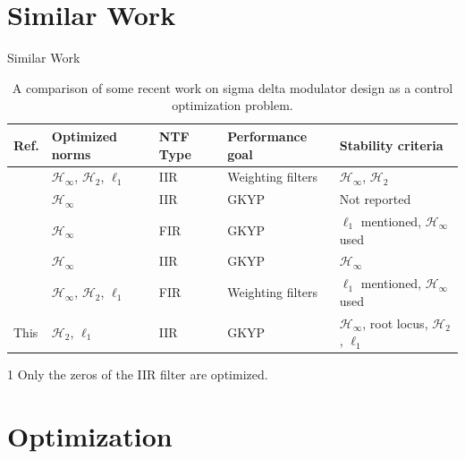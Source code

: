\documentclass[10pt,usenames,dvipsnames]{beamer}
\begin{document}
\section{Similar Work}

\begin{frame}{Similar Work}

\vspace{-0.8cm}
\begin{table}
\begin{threeparttable}
	\caption{A comparison of some recent work on sigma delta modulator design as a control optimization problem.}
	\begin{tabular}{p{0.5cm} p{1.8cm} p{0.6cm} p{1.9cm} p{3.3cm}}
		\toprule
		\textbf{Ref.} & \textbf{Optimized norms} & \textbf{NTF Type} & \textbf{Performance goal} & \textbf{Stability criteria} \\
		\midrule
		\cite{Oberoi2004} & $\mathcal{H}_\infty$, $\mathcal{H}_2$, $\ell_1$ & IIR &  Weighting filters & $\mathcal{H}_\infty$, $\mathcal{H}_2$ \\ 
		\cite{Osqui2007} & $\mathcal{H}_\infty$ & IIR\tnote{1} & GKYP & Not reported \\
		\cite{Nagahara2012} & $\mathcal{H}_\infty$ & FIR & GKYP & $\ell_1$ mentioned, $\mathcal{H}_\infty$ used \\
		\cite{Li2014} & $\mathcal{H}_\infty$ & IIR & GKYP & $\mathcal{H}_\infty$ \\
		\cite{Tariq2016} & $\mathcal{H}_\infty$, $\mathcal{H}_2$, $\ell_1$ & FIR & Weighting filters & $\ell_1$ mentioned, $\mathcal{H}_\infty$ used \\
		This & $\mathcal{H}_2$, $\ell_1$ & IIR & GKYP & $\mathcal{H}_\infty$, root locus, $\mathcal{H}_2$, $\ell_1$ \\
		\bottomrule
	\end{tabular}
	\begin{tablenotes}
		\item[1] Only the zeros of the IIR filter are optimized.
	\end{tablenotes}
\end{threeparttable}
\end{table}

\end{frame}

\section{Optimization}
\end{document}

